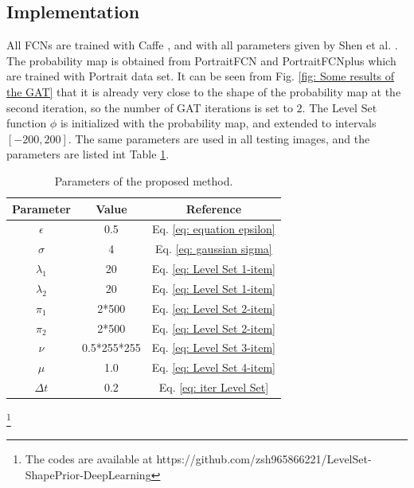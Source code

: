 \subsection{Implementation}
All FCNs are trained with Caffe \cite{FCN:caffe:jia2014caffe}, and with all parameters given by Shen et al. \cite{FCN:segmentation:shen2016automatic}. The probability map is obtained from PortraitFCN and PortraitFCNplus which are trained with Portrait data set.
It can be seen from Fig. \ref{fig: Some results of the GAT} that it is already very close to the shape of the probability map at the second iteration, so the number of GAT iterations is set to $2$. The Level Set function $\phi$ is initialized with the probability map, and extended to intervals $[-200, 200]$. The same parameters are used in all testing images, and the parameters are listed int Table \ref{table: Parameters of the proposed method}.
\begin{table}[h]
    \centering
    \caption{Parameters of the proposed method.}\label{table: Parameters of the proposed method}
    \begin{tabular}{c|c|c}
        \hline
        \hline
        Parameter & Value & Reference \\
        \hline
        $\epsilon$ & 0.5 & Eq. \ref{eq: equation epsilon} \\
        $\sigma$ & 4 & Eq. \ref{eq: gaussian sigma} \\
        $\lambda_1$ & 20 & Eq. \ref{eq: Level Set 1-item} \\
        $\lambda_2$ & 20 & Eq. \ref{eq: Level Set 1-item} \\
        $\pi_1$ & 2*500 & Eq. \ref{eq: Level Set 2-item} \\
        $\pi_2$ & 2*500 & Eq. \ref{eq: Level Set 2-item} \\
        $\nu$ & 0.5*255*255 & Eq. \ref{eq: Level Set 3-item} \\
        $\mu$ & 1.0 & Eq. \ref{eq: Level Set 4-item} \\
        $\Delta t$ & 0.2 & Eq. \ref{eq: iter Level Set} \\
        \hline
        \hline
    \end{tabular}
\end{table}
\footnote{The codes are available at https://github.com/zsh965866221/LevelSet-ShapePrior-DeepLearning}

